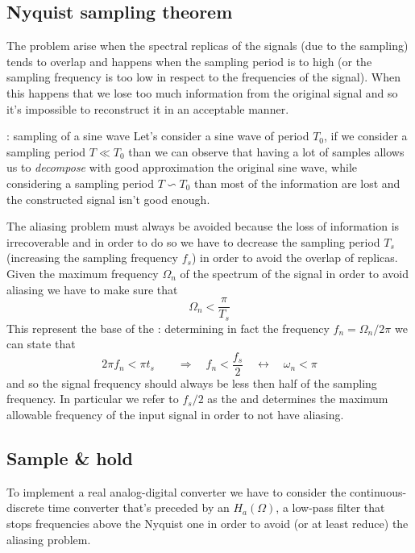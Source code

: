 	\subsection{Nyquist sampling theorem}
		The  problem arise when the spectral replicas of the signals (due to the sampling) tends to overlap and happens when the sampling period is to high (or the sampling frequency is too low in respect to the frequencies of the signal). When this happens that we lose too much information from the original signal and so it's impossible to reconstruct it in an acceptable manner. 
		
		\begin{example}{: sampling of a sine wave}
			Let's consider a sine wave of period $T_0$, if we consider a sampling period $T \ll T_0$ than we can observe that having a lot of samples allows us to \textit{decompose} with good approximation the original sine wave, while considering a sampling period $T \backsim T_0$ than most of the information are lost and the constructed signal isn't good enough.
		\end{example}
		
		The aliasing problem must always be avoided because the loss of information is irrecoverable and in order to do so we have to decrease the sampling period $T_s$ (increasing the sampling frequency $f_s$) in order to avoid the overlap of replicas. Given the maximum frequency $\Omega_n$ of the spectrum of the signal in order to avoid aliasing we have to make sure that
		\[ \Omega_n < \frac \pi {T_s} \]
		This represent the base of the : determining in fact the frequency $f_n = \Omega_n/2\pi$ we can state that
		\begin{equation}
			2\pi f_n < \pi t_s \qquad \Rightarrow \quad f_n < \frac{f_s}{2} \quad \leftrightarrow \quad \omega_n < \pi
		\end{equation}
		and so the signal frequency should always be less then half of the sampling frequency. In particular we refer to $f_s/2$ as the  and determines the maximum allowable frequency of the input signal in order to not have aliasing.
		
	\subsection{Sample \& hold}
		To implement a real analog-digital converter we have to consider the continuous-discrete time converter that's preceded by an  $H_a(\Omega)$, a low-pass filter that stops frequencies above the Nyquist one in order to avoid (or at least reduce) the aliasing problem.
		
